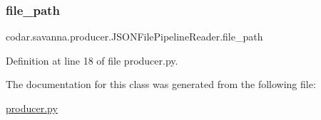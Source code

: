 \subsubsection{\texorpdfstring{file\+\_\+path}{file\_path}}
{\footnotesize\ttfamily codar.\+savanna.\+producer.\+J\+S\+O\+N\+File\+Pipeline\+Reader.\+file\+\_\+path}



Definition at line 18 of file producer.\+py.



The documentation for this class was generated from the following file\+:\begin{DoxyCompactItemize}
\item 
\hyperlink{producer_8py}{producer.\+py}\end{DoxyCompactItemize}
